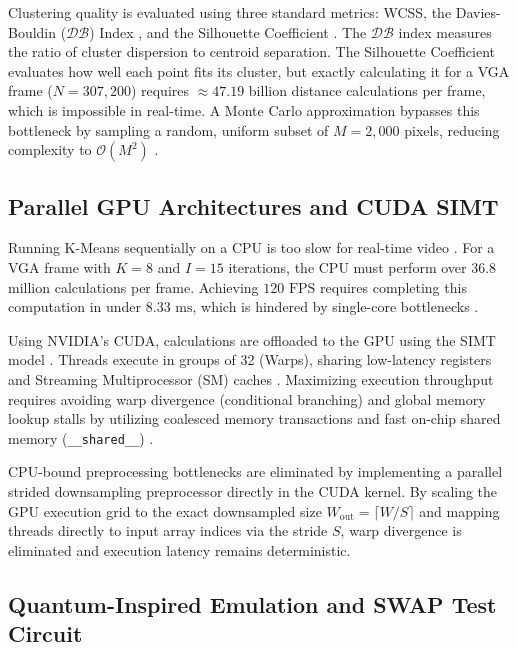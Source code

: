 Clustering quality is evaluated using three standard metrics: WCSS, the Davies-Bouldin ($\mathcal{D}\mathcal{B}$) Index \cite{davies1979cluster}, and the Silhouette Coefficient \cite{rousseeuw1987silhouettes}. The $\mathcal{D}\mathcal{B}$ index measures the ratio of cluster dispersion to centroid separation. The Silhouette Coefficient evaluates how well each point fits its cluster, but exactly calculating it for a VGA frame ($N=307,200$) requires $\approx 47.19$ billion distance calculations per frame, which is impossible in real-time. A Monte Carlo approximation bypasses this bottleneck by sampling a random, uniform subset of $M=2,000$ pixels, reducing complexity to $\mathcal{O}(M^2)$ \cite{shutaywi2021silhouette}.

\subsection{Parallel GPU Architectures and CUDA SIMT}
Running K-Means sequentially on a CPU is too slow for real-time video \cite{farivar2008parallel}. For a VGA frame with $K=8$ and $I=15$ iterations, the CPU must perform over $36.8$ million calculations per frame. Achieving $120\text{ FPS}$ \cite{cruden2019simulator, jerald2009scene} requires completing this computation in under $8.33\text{ ms}$, which is hindered by single-core bottlenecks \cite{cook2012cuda}.

Using NVIDIA's CUDA, calculations are offloaded to the GPU using the SIMT model \cite{CudaGuide}. Threads execute in groups of 32 (Warps), sharing low-latency registers and Streaming Multiprocessor (SM) caches \cite{cook2012cuda}. Maximizing execution throughput requires avoiding warp divergence (conditional branching) and global memory lookup stalls by utilizing coalesced memory transactions and fast on-chip shared memory (\texttt{\_\_shared\_\_}) \cite{CudaGuide, farivar2008parallel}.

CPU-bound preprocessing bottlenecks are eliminated by implementing a parallel strided downsampling preprocessor directly in the CUDA kernel. By scaling the GPU execution grid to the exact downsampled size $W_{\text{out}} = \lceil W/S \rceil$ and mapping threads directly to input array indices via the stride $S$, warp divergence is eliminated and execution latency remains deterministic.

\subsection{Quantum-Inspired Emulation and SWAP Test Circuit}
